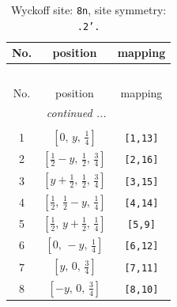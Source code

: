 \documentclass[fleqn,8pt]{jsarticle}
\begin{document}
\begin{longtable}{ccc}
\caption{Wyckoff site: {\tt 8n}, site symmetry: {\tt .2'.}}
 \\
 \hline \hline
No. & position & mapping \\ \hline \endfirsthead

\multicolumn{2}{l}{\tablename\ \thetable{}} \\
 \hline \hline
No. & position & mapping \\ \hline \endhead

 \hline \hline
\multicolumn{2}{r}{\footnotesize\it continued ...} \\ \endfoot

 \hline \hline
\multicolumn{2}{r}{} \\ \endlastfoot

1 & $\left[ 0,\, y,\, \frac{1}{4} \right]$ & {\tt [1,13]} \\ \hline
2 & $\left[ \frac{1}{2} - y,\, \frac{1}{2},\, \frac{3}{4} \right]$ & {\tt [2,16]} \\ \hline
3 & $\left[ y + \frac{1}{2},\, \frac{1}{2},\, \frac{3}{4} \right]$ & {\tt [3,15]} \\ \hline
4 & $\left[ \frac{1}{2},\, \frac{1}{2} - y,\, \frac{1}{4} \right]$ & {\tt [4,14]} \\ \hline
5 & $\left[ \frac{1}{2},\, y + \frac{1}{2},\, \frac{1}{4} \right]$ & {\tt [5,9]} \\ \hline
6 & $\left[ 0,\, - y,\, \frac{1}{4} \right]$ & {\tt [6,12]} \\ \hline
7 & $\left[ y,\, 0,\, \frac{3}{4} \right]$ & {\tt [7,11]} \\ \hline
8 & $\left[ - y,\, 0,\, \frac{3}{4} \right]$ & {\tt [8,10]} \\
\end{longtable}
\renewcommand{\arraystretch}{1.2}
\end{document}
